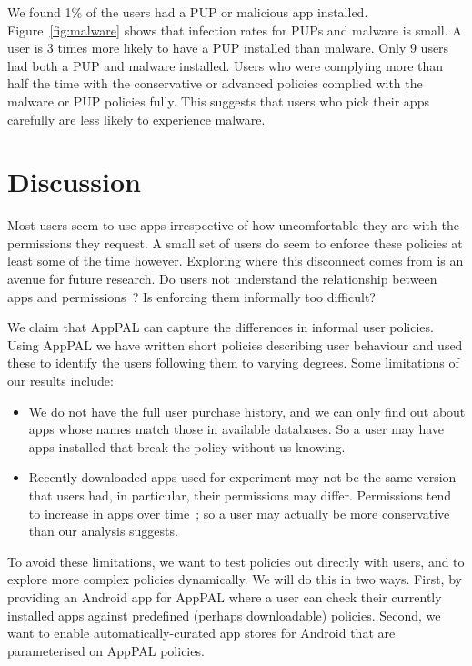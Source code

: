 \documentclass[]{soups-poster}
\newcommand{\citep}[1]{\cite{#1}}
\begin{document}
We found 1\% of the users had a PUP or malicious app installed.
Figure~\ref{fig:malware} shows that infection rates for PUPs and malware is small. 
A user is 3 times more likely to have a PUP installed than malware.
Only 9 users had both a PUP and malware installed.
Users who were complying more than half the time with the conservative or advanced policies complied with the malware or PUP policies fully.
This suggests that users who pick their apps carefully are less likely to experience malware.

\section{Discussion}

Most users seem to use apps irrespective of how uncomfortable they are with the permissions they request.
A small set of users do seem to enforce these policies at least some of the time however.
Exploring where this disconnect comes from is an avenue for future research.
Do users not understand the relationship between apps and permissions~\citep{Felt:2012hma}?
Is enforcing them informally too difficult?

We claim that AppPAL can capture the differences in informal user policies. %
Using AppPAL we have written short policies describing user behaviour and used these to identify the users following them to varying degrees.
Some limitations of our results include:
\begin{itemize}
\item We do not have the full user purchase history, and we can only find out about apps whose names match those in available databases.  %
  So a user may have apps installed that break the policy without us knowing.
\item Recently downloaded apps used for experiment may not be the same version that users had, in particular, their permissions may differ.
  Permissions tend to increase in apps over time~\citep{Wei:2012id}; so a user may actually be more conservative than our analysis suggests.
\end{itemize}

To avoid these limitations, we want to test policies out directly with users, and to explore more complex policies dynamically.  
We will do this in two ways.  
First, by providing an Android app for AppPAL where a user can check their currently installed apps against predefined (perhaps downloadable) policies.  
Second, we want to enable automatically-curated app stores for Android that are parameterised on AppPAL policies.



\end{document}
